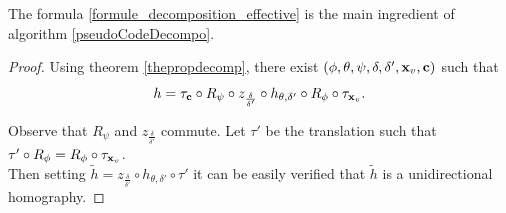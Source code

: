 \begin{remarque}
The formula \eqref{formule_decomposition_effective}  is the main ingredient of algorithm \ref{pseudoCodeDecompo}.
\end{remarque}


\begin{proof}
	 Using theorem \ref{thepropdecomp}, there exist $(\phi,\theta,\psi,\delta,\delta',\mathbf{x}_v,\mathbf{c})$ such that 
	 \begin{equation*}
	 h = \tau_{\mathbf{c}} \circ R_{\psi} \circ z_{\frac{\delta}{\delta'}} \circ h_{\theta,\delta'} \circ R_{\phi} \circ \tau_{\mathbf{x}_v}.
	 \end{equation*}
	 
\noindent Observe that $R_\psi$ and $z_{\frac{\delta}{\delta'}}$ commute. Let $\tau'$ be the translation such that $\tau' \circ R_\phi =  R_\phi \circ \tau_{\mathbf{x}_v}$.\\
	 Then setting $\tilde{h} = z_{\frac{\delta}{\delta'}} \circ h_{\theta,\delta'} \circ \tau'$ it can be easily verified that $\tilde{h}$ is a unidirectional homography.
	 \end{proof}
	\label{ref_schema_decomp_cool}
